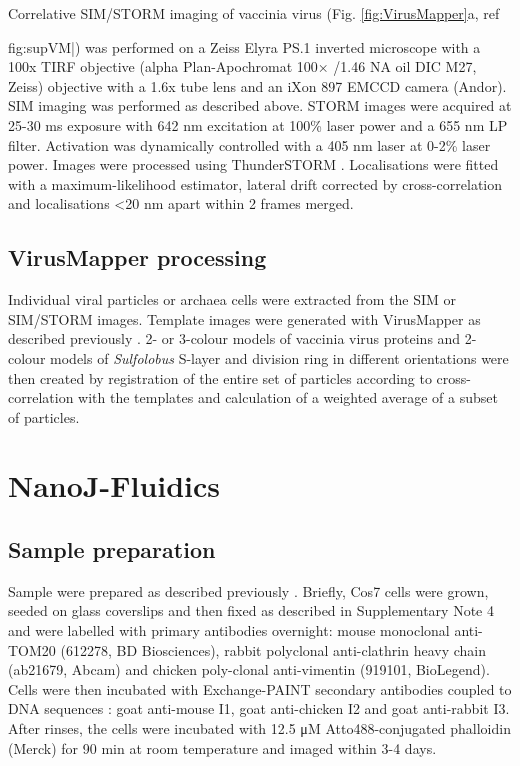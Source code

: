 Correlative SIM/STORM imaging of vaccinia virus (Fig. \ref{fig:VirusMapper}a, ref{fig:supVM|) was performed on a Zeiss Elyra PS.1 inverted microscope with a 100x TIRF objective (alpha Plan-Apochromat 100× /1.46 NA oil DIC M27, Zeiss) objective with a 1.6x tube lens and an iXon 897 EMCCD camera (Andor). SIM imaging was performed as described above. STORM images were acquired at 25-30 ms exposure with 642 nm excitation at 100\% laser power and a 655 nm LP filter. Activation was dynamically controlled with a 405 nm laser at 0-2\% laser power. Images were processed using ThunderSTORM \cite{ovesny2014thunderstorm}. Localisations were fitted with a maximum-likelihood estimator, lateral drift corrected by cross-correlation and localisations <20 nm apart within 2 frames merged.
 
\subsection{VirusMapper processing}

Individual viral particles or archaea cells were extracted from the SIM or SIM/STORM images. Template images were generated with VirusMapper as described previously \cite{gray2016virusmapper}. 2- or 3-colour models of vaccinia virus proteins and 2-colour models of \emph{Sulfolobus} S-layer and division ring in different orientations were then created by registration of the entire set of particles according to cross-correlation with the templates and calculation of a weighted average of a subset of particles. 

\section{NanoJ-Fluidics}

\subsection{Sample preparation}

Sample were prepared as described previously \cite{almada2018automating}. Briefly, Cos7 cells were grown, seeded on glass coverslips and then fixed as described in Supplementary Note 4 and were labelled with primary antibodies overnight: mouse monoclonal anti-TOM20 (612278, BD Biosciences), rabbit polyclonal anti-clathrin heavy chain (ab21679, Abcam) and chicken poly-clonal anti-vimentin (919101, BioLegend). Cells were then incubated with Exchange-PAINT secondary antibodies coupled to DNA sequences \cite{almada2018automating}: goat anti-mouse I1, goat anti-chicken I2 and goat anti-rabbit I3. After rinses, the cells were incubated with 12.5 μM Atto488-conjugated phalloidin (Merck) for 90 min at room temperature and imaged within 3-4 days. 

}
